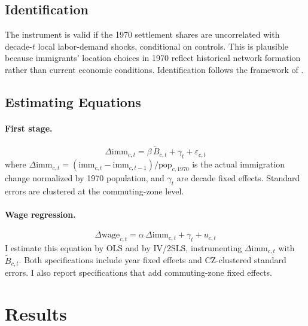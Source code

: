 \documentclass[12pt]{article}
\begin{document}
\subsection{Identification}

The instrument is valid if the 1970 settlement shares are uncorrelated
with decade-$t$ local labor-demand shocks, conditional on controls. This
is plausible because immigrants' location choices in 1970 reflect
historical network formation rather than current economic conditions.
Identification follows the framework of
\citet{goldsmith2020bartik}.

\subsection{Estimating Equations}

\paragraph{First stage.}
\begin{equation}
    \Delta \text{imm}_{c,t} = \beta\,\widetilde{B}_{c,t}
    + \gamma_t + \varepsilon_{c,t}
\end{equation}
where $\Delta \text{imm}_{c,t} = (\text{imm}_{c,t} -
\text{imm}_{c,t-1})/\text{pop}_{c,1970}$ is the actual immigration
change normalized by 1970 population, and $\gamma_t$ are decade fixed
effects. Standard errors are clustered at the commuting-zone level.

\paragraph{Wage regression.}
\begin{equation}
    \Delta \text{wage}_{c,t} = \alpha\,\Delta \text{imm}_{c,t}
    + \gamma_t + u_{c,t}
\end{equation}
I estimate this equation by OLS and by IV/2SLS, instrumenting
$\Delta\text{imm}_{c,t}$ with $\widetilde{B}_{c,t}$. Both specifications
include year fixed effects and CZ-clustered standard errors. I also
report specifications that add commuting-zone fixed effects.

\section{Results}
\end{document}
